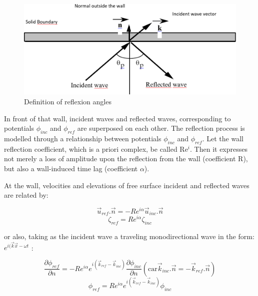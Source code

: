 \begin{figure}[H]%
\begin{center}
%
  \includegraphics[width=\textwidth]{./graphics/reflex}
%
\caption{Definition of reflexion angles}\label{fig:reflex}
\end{center}
\end{figure}

In front of that wall, incident waves and reflected waves, corresponding to
potentials $\phi_{inc}$ and $\phi_{ref}$ are superposed on
each other. The reflection process is modelled through a relationship
between potentials $\phi_{inc}$ and $\phi_{ref}$. Let the
wall reflection coefficient, which is a priori complex, be called
Re${}^{i}$. Then it expresses not merely a loss of amplitude upon the
reflection from the wall (coefficient R), but also a wall-induced time lag
(coefficient $\alpha$).

At the wall, velocities and elevations of free surface incident and reflected
waves are related by:

\begin{equation}
  \overrightarrow{u}_{ref}.\overrightarrow{n} = -Re^{i\alpha}\overrightarrow{u}_{inc}.\overrightarrow{n}
  \label{eq:3.56}
\end{equation}
\begin{equation}
  \zeta_{ref} = Re^{i\alpha}\zeta_{inc}
  \label{eq:3.57}
\end{equation}

or also, taking as the incident wave a traveling monodirectional wave in the
form: $e^{i(\overrightarrow{k}\overrightarrow{x}-\omega t}$ :

\begin{equation}
  \frac{\partial \phi_{ref}}{\partial n} = -Re^{i\alpha}e^{i(\overrightarrow{k}_{ref}-\overrightarrow{k}_{inc})}
           \frac{\partial\phi_{inc}}{\partial n}(\text{car}\overrightarrow{k}_{inc}.\overrightarrow{n} = -\overrightarrow{k}_{ref}.\overrightarrow{n})
  \label{eq:3.58}
\end{equation}
\begin{equation}
  \phi_{ref} = Re^{i\alpha}e^{i(\overrightarrow{k}_{ref}-\overrightarrow{k}_{inc})}\phi_{inc}
  \label{eq:3.59}
\end{equation}

